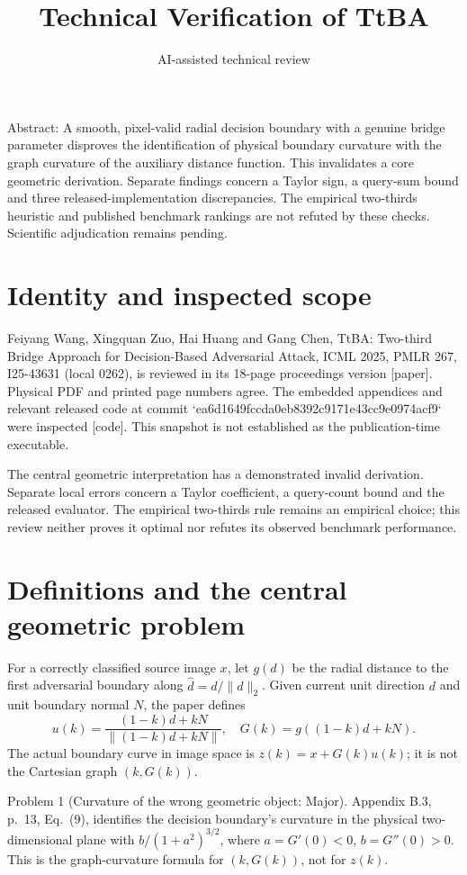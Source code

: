 \documentclass[10pt]{article}
\title{Technical Verification of TtBA}
\author{AI-assisted technical review}
\date{}
\begin{document}
\maketitle
Abstract: A smooth, pixel-valid radial decision boundary with a genuine bridge parameter disproves the identification of physical boundary curvature with the graph curvature of the auxiliary distance function. This invalidates a core geometric derivation. Separate findings concern a Taylor sign, a query-sum bound and three released-implementation discrepancies. The empirical two-thirds heuristic and published benchmark rankings are not refuted by these checks. Scientific adjudication remains pending.\par
\section*{Identity and inspected scope}
Feiyang Wang, Xingquan Zuo, Hai Huang and Gang Chen, TtBA: Two-third Bridge Approach for Decision-Based Adversarial Attack, ICML 2025, PMLR 267, I25-43631 (local 0262), is reviewed in its 18-page proceedings version [paper]. Physical PDF and printed page numbers agree. The embedded appendices and relevant released code at commit `ea6d1649fccda0eb8392c9171e43cc9e0974acf9` were inspected [code]. This snapshot is not established as the publication-time executable.\par
The central geometric interpretation has a demonstrated invalid derivation. Separate local errors concern a Taylor coefficient, a query-count bound and the released evaluator. The empirical two-thirds rule remains an empirical choice; this review neither proves it optimal nor refutes its observed benchmark performance.\par
\section*{Definitions and the central geometric problem}
For a correctly classified source image \(x\), let \(g(d)\) be the radial distance to the first adversarial boundary along \(\hat d=d/\|d\|_2\). Given current unit direction \(d\) and unit boundary normal \(N\), the paper defines \[u(k)=\frac{(1-k)d+kN}{\|(1-k)d+kN\|},\quad G(k)=g((1-k)d+kN).\] The actual boundary curve in image space is \(z(k)=x+G(k)u(k)\); it is not the Cartesian graph \((k,G(k))\).\par
Problem 1 (Curvature of the wrong geometric object: Major).  Appendix B.3, p. 13, Eq. (9), identifies the decision boundary’s curvature in the physical two-dimensional plane with \(b/(1+a^2)^{3/2}\), where \(a=G'(0)<0\), \(b=G''(0)>0\). This is the graph-curvature formula for \((k,G(k))\), not for \(z(k)\).\par
\end{document}
